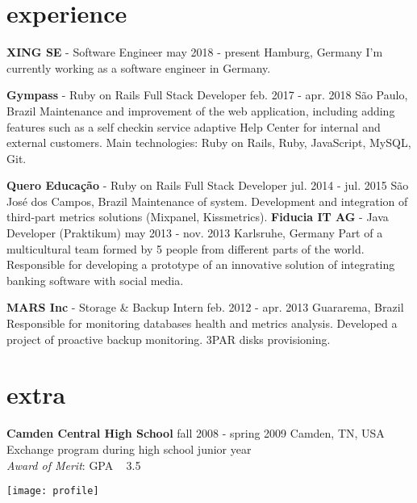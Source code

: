 \documentclass[]{friggeri-cv}
\begin{document}
\section{experience}

\begin{entrylist}
\entry
  {\textbf{XING SE} - Software Engineer}
  {may 2018 - present}
  {Hamburg, Germany}
  { I'm currently working as a software engineer in Germany.}
  
  \entry
  {\textbf{Gympass} - Ruby on Rails Full Stack Developer}
  {feb. 2017 - apr. 2018}
  {São Paulo, Brazil}
  { \small{ Maintenance and improvement of the web application, including adding features such as a self checkin service adaptive Help Center for internal and external customers. Main technologies: Ruby on Rails, Ruby, JavaScript, MySQL, Git.}}
  
  \entry
    {\textbf{Quero Educação} - Ruby on Rails Full Stack Developer}
    {jul. 2014 - jul. 2015}
    {São José dos Campos, Brazil}
  { Maintenance of system. Development and integration of third-part metrics solutions (Mixpanel, Kissmetrics).}
  \entry
  	{\textbf{Fiducia IT AG} - Java Developer (Praktikum)}
    {may 2013 - nov. 2013}
    {Karlsruhe, Germany}
    {Part of a multicultural team formed by 5 people from different parts of the world. Responsible for developing a prototype of an innovative solution of integrating banking software with social media.}

  \entry
    {\textbf{MARS Inc} - Storage \& Backup Intern}
    {feb. 2012 - apr. 2013}
    {Guararema, Brazil}
    {Responsible for monitoring databases health and metrics analysis. Developed a project of proactive backup monitoring. 3PAR disks provisioning.}

\end{entrylist}

\section{extra}

\begin{entrylist}
  \entry
    {\textbf{Camden Central High School}}
    {fall 2008 - spring 2009}
    {Camden, TN, USA}
    {Exchange program during high school junior year\\
    \textit{Award of Merit}: GPA \geq ~ 3.5}\\


\end{entrylist}

\begin{rside}
 \texttt{[image: profile]}
\end{rside}
\end{document}
